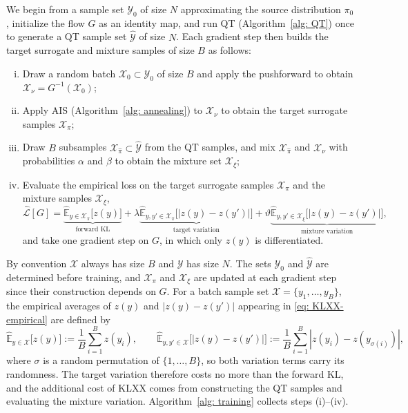 \documentclass{article}
\begin{document}
We begin from a sample set $\mathcal Y_0$ of size $N$ approximating the source distribution $\pi_0$, initialize the flow $G$ as an identity map, and run QT (Algorithm~\ref{alg: QT}) once to generate a QT sample set $\hat{\mathcal Y}$ of size $N$. Each gradient step then builds the target surrogate and mixture samples of size $B$ as follows:
\begin{enumerate}[(i)]
	\setlength{\itemsep}{0pt}
	\item Draw a random batch $\mathcal X_0\subset \mathcal Y_0$ of size $B$ and apply the pushforward to obtain $\mathcal X_{\nu} = G^{-1}(\mathcal X_0)$;
	\item Apply AIS (Algorithm~\ref{alg: annealing}) to {\color{blue}$\mathcal X_\nu$} to obtain the target surrogate samples $\mathcal X_{\pi}$;
	\item Draw $B$ subsamples $\mathcal X_{\hat\pi}\subset \hat{\mathcal Y}$ from the QT samples, and mix $\mathcal X_{\hat\pi}$ and $\mathcal X_{\nu}$ with probabilities $\alpha$ and $\beta$ to obtain the mixture set $\mathcal X_{\xi}$;
	\item Evaluate the empirical loss on the target surrogate samples $\mathcal X_{\pi}$ and the mixture samples $\mathcal X_{\xi}$,
	\begin{equation}
	\widehat{\mathcal L}[G]=\underbrace{\widehat{\mathbb E}_{y\in\mathcal X_\pi}\bigl[z(y)\bigr]}_{\text{forward KL}} +
	\lambda\underbrace{\widehat{\mathbb E}_{y,y'\in\mathcal X_\pi}\bigl[|z(y)-z(y')|\bigr]}_{\text{target variation}}
	+\vartheta\underbrace{\widehat{\mathbb E}_{y,y'\in\mathcal X_{\xi}}\bigl[|z(y)-z(y')|\bigr]}_{\text{mixture variation}},
	\label{eq: KLXX-empirical}
	\end{equation}
	and take one gradient step on $G$, in which only $z(y) $ is differentiated.
\end{enumerate}
By convention $\mathcal X$ always has size $B$ and $\mathcal Y$ has size $N$. {\color{blue}The sets $\mathcal Y_0$ and $\hat{\mathcal Y}$ are determined before training, and $\mathcal X_{\pi}$ and $\mathcal X_{\xi}$ are updated at each gradient step since their construction depends on $G$.}
For a batch sample set $\mathcal X = \{y_1,\dots,y_B\}$, the empirical averages of $z(y)$ and $|z(y)-z(y')|$ appearing in \eqref{eq: KLXX-empirical} are defined by
\begin{equation}
	\widehat{\mathbb E}_{y\in \mathcal X} \big[z(y)\big] := \frac1B \sum_{i=1}^B z(y_i), \qquad \widehat{\mathbb E}_{y,y'\in \mathcal X} \big[|z(y)-z(y')|\big] := \frac1B\sum_{i=1}^B |z(y_i) - z(y_{\sigma(i)})|,
	\label{eq: empirical-variation}
\end{equation}
where $\sigma$ is a random permutation of $\{1,\dots,B\}$, so both variation terms carry its randomness. The target variation therefore costs no more than the forward KL, and the additional cost of KLXX comes from constructing the QT samples and evaluating the mixture variation. Algorithm~\ref{alg: training} collects steps (i)--(iv).
\end{document}
